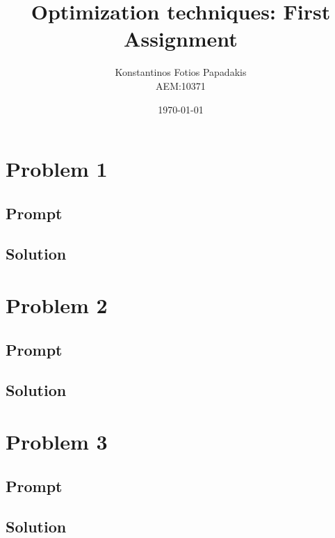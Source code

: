 \documentclass[twocolumn]{report}
\begin{document}
\title{\Huge \bfseries Optimization techniques: First Assignment} %
\author{Konstantinos Fotios Papadakis\vspace{0.5cm} \\  AEM:10371} %
\date{\today}
\maketitle

\tableofcontents

\chapter{Problem 1}
\section{Prompt}

\section{Solution}


\chapter{Problem 2}
\section{Prompt}

\section{Solution}


\chapter{Problem 3}
\section{Prompt}

\section{Solution}

\end{document}

